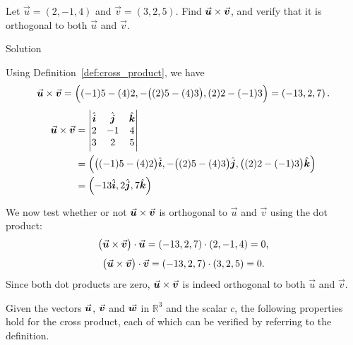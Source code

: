 \fi
\begin{example}\label{ex_crossp1}
Let $\vec u = \left( 2,-1,4\right)$ and $\vec v = \left( 3,2,5\right)$. Find $\crossp uv$, and verify that it is orthogonal to both $\vec u$ and $\vec v$.

\pagebreak
{}Solution 

Using Definition~\ref{def:cross_product}, we have
\ifcalculus
$$\crossp uv = \left( (-1)5-(4)2,-\big((2)5-(4)3\big), (2)2-(-1)3\right)= \left( -13,2,7\right).$$ 
\fi
\ifanalysis
\renewcommand{\arraystretch}{1}
$$
{\displaystyle {\begin{aligned}\crossp uv  &=\begin{vmatrix}\hat {i} &\hat {j} &\hat {k} \\2&-1&4\\3&2&5\\\end{vmatrix}\\
&=\left( \big((-1)5-(4)2\big)\hat i,-\big((2)5-(4)3\big)\hat j, \big((2)2-(-1)3\big)\hat k\right)\\
&= \left( -13\hat i,2\hat j,7\hat k\right)\end{aligned}}}
$$
\fi

\enlargethispage{2\baselineskip}
We now test whether or not $\crossp uv$ is orthogonal to $\vec u$ and $\vec v$ using the dot product:
$$\big(\crossp uv\big) \cdot \vec u = \left( -13,2,7\right)\cdot \left( 2,-1,4\right)= 0,$$
$$\big(\crossp uv\big) \cdot \vec v = \left( -13,2,7\right)\cdot \left( 3,2,5 \right)= 0.$$
Since both dot products are zero, $\crossp uv$ is indeed orthogonal to both $\vec u$ and $\vec v$.
\end{example}



Given the vectors  $\vecu$, $\vecv$ and $\vecw$ in $\mathbb{R}^3$ and the scalar $c$, the following  properties hold for the cross product, each of which can be verified by referring to the definition.

